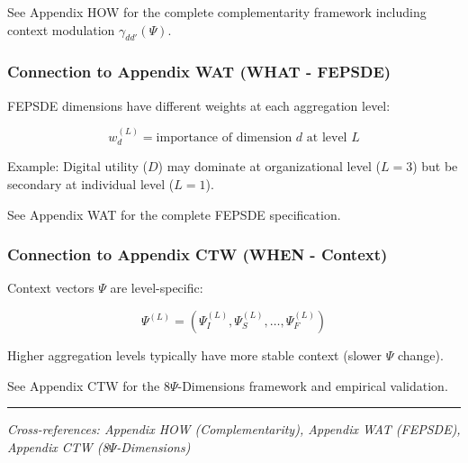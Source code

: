 See Appendix HOW for the complete complementarity framework including context 
modulation $\gamma_{dd'}(\Psi)$.

\subsubsection{Connection to Appendix WAT (WHAT - FEPSDE)}

FEPSDE dimensions have different weights at each aggregation level:

\begin{equation}
w_d^{(L)} = \text{importance of dimension } d \text{ at level } L
\end{equation}

Example: Digital utility ($D$) may dominate at organizational level ($L=3$) 
but be secondary at individual level ($L=1$).

See Appendix WAT for the complete FEPSDE specification.

\subsubsection{Connection to Appendix CTW (WHEN - Context)}

Context vectors $\Psi$ are level-specific:

\begin{equation}
\Psi^{(L)} = (\Psi_I^{(L)}, \Psi_S^{(L)}, \ldots, \Psi_F^{(L)})
\end{equation}

Higher aggregation levels typically have more stable context (slower $\Psi$ change).

See Appendix CTW for the 8$\Psi$-Dimensions framework and empirical validation.

\vspace{0.5em}
\hrule
\vspace{0.5em}
\noindent\textit{Cross-references: Appendix HOW (Complementarity), 
Appendix WAT (FEPSDE), Appendix CTW (8$\Psi$-Dimensions)}

